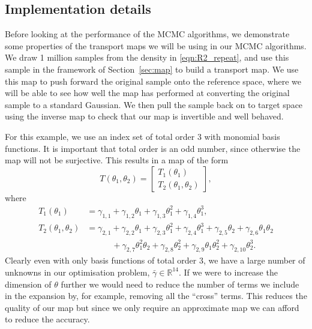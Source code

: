 \documentclass[final]{siamltex}
\begin{document}
\subsection{Implementation details}

Before looking at the performance of the MCMC algorithms, we demonstrate some properties of the transport maps we will be using in our MCMC algorithms. We draw 1 million samples from the density in \eqref{eqn:R2_repeat}, and use this sample in the framework of Section~\ref{sec:map} to build a transport map. We use this map to push forward the original sample onto the reference space, where we will be able to see how well the map has performed at converting the original sample to a standard Gaussian. We then pull the sample back on to target space using the inverse map to check that our map is invertible and well behaved.

For this example, we use an index set of total order 3 with monomial
basis functions. It is important that total order is an odd number,
since otherwise the map will not be surjective. This results in a map of the form
\[
	T(\theta_1, \theta_2) = \begin{bmatrix} T_1(\theta_1) \\ T_2(\theta_1, \theta_2) \end{bmatrix},
\]
where
\begin{align*}
		T_1(\theta_1) &= \gamma_{1,1} + \gamma_{1,2}\theta_1 + \gamma_{1,3}\theta_1^2 + \gamma_{1,4}\theta_1^3, \\
		T_2(\theta_1, \theta_2) &= \gamma_{2,1} + \gamma_{2,2}\theta_1 + \gamma_{2,3}\theta_1^2 + \gamma_{2,4}\theta_1^3
					+ \gamma_{2,5}\theta_2 + \gamma_{2,6}\theta_1\theta_2 \\
				 & \qquad \quad + \gamma_{2,7}\theta_1^2\theta_2 + \gamma_{2,8}\theta_2^2 + \gamma_{2,9}\theta_1\theta_2^2 +
					 \gamma_{2,10}\theta_2^3.
\end{align*}
Clearly even with only basis functions of total order 3, we have a large number of unknowns in our optimisation problem, $\bar{\gamma} \in \mathbb{R}^{14}$. If we were to increase the dimension of $\theta$ further we would need to reduce the number of terms we include in the expansion by, for example, removing all the ``cross'' terms. This reduces the quality of our map but since we only require an approximate map we can afford to reduce the accuracy.
\end{document}
